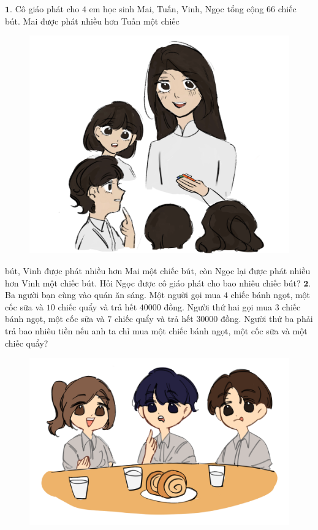 \begin{multicols}{2}
	$\pmb{1.}$ 	Cô giáo phát cho $4$ em học sinh Mai, Tuấn, Vinh, Ngọc tổng cộng $66$ chiếc bút. 	Mai được phát nhiều hơn Tuấn một chiếc
	\begin{figure}[H]
		\centering
		\vspace*{-5pt}
		\captionsetup{labelformat= empty, justification=centering}
		\includegraphics[width=0.75\linewidth]{b1}
		\vspace*{-5pt}
	\end{figure}
  bút, Vinh được phát nhiều hơn Mai một chiếc bút, còn Ngọc lại được phát nhiều hơn Vinh một chiếc bút. Hỏi Ngọc được cô giáo phát cho bao nhiêu chiếc bút?
\vskip 0.1cm
	$\pmb{2.}$ 	Ba người bạn cùng vào quán ăn sáng. Một người gọi mua $4$ chiếc bánh ngọt, một cốc sữa và $10$ chiếc quẩy và trả hết $40000$ đồng. Người thứ hai gọi mua $3$ chiếc bánh ngọt, một cốc sữa và $7$ chiếc quẩy và trả hết $30000$ đồng. Người thứ ba phải trả bao nhiêu tiền nếu anh ta chỉ mua một chiếc bánh ngọt, một cốc sữa và một chiếc quẩy?
	\begin{figure}[H]
			\centering
			\vspace*{-5pt}
			\captionsetup{labelformat= empty, justification=centering}
			\includegraphics[width=0.85\linewidth]{b2}

\end{figure}
\end{multicols}
